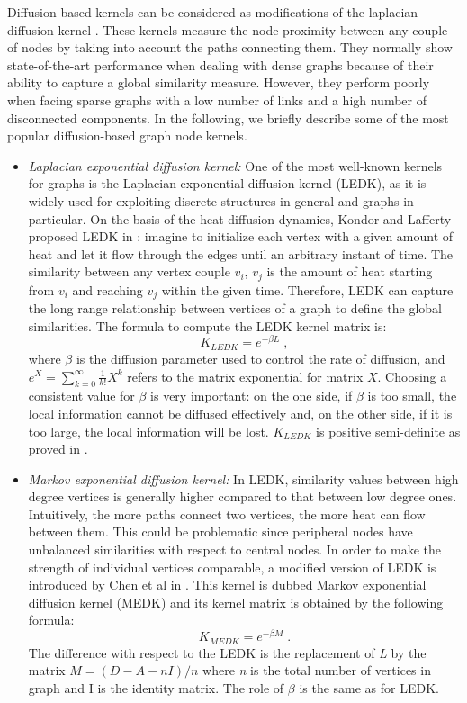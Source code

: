 \documentclass[runningheads,a4paper]{llncs}
\begin{document}
Diffusion-based kernels can be considered as modifications of the laplacian diffusion kernel \cite{proceeding2}. These kernels measure the node proximity between any couple of nodes by taking into account the paths connecting them. They normally show state-of-the-art performance when dealing with dense graphs because of their ability to capture a global similarity measure. However, they perform poorly  when facing  sparse graphs with a low number of links and a high number of disconnected components. In the following, we briefly describe some of the most popular diffusion-based graph node kernels.
\begin{itemize}
\item \textit{Laplacian exponential diffusion kernel:} One of the most well-known kernels for graphs is the Laplacian exponential diffusion kernel (LEDK), as it is widely used for exploiting discrete structures in general and graphs in particular. On the basis of the heat diffusion dynamics, Kondor and Lafferty proposed LEDK in \cite{proceeding2}: imagine to initialize each vertex with a given amount of heat and let it flow through the edges until an arbitrary instant of time. The similarity between any vertex couple $v_{i}$, $v_{j}$ is the amount of heat starting from $v_{i}$ and reaching $v_{j}$ within the given time. Therefore, LEDK can capture the long range relationship between vertices of a graph to define the global similarities. The formula to compute the LEDK kernel matrix is:
\begin{equation}
K_{LEDK} = e^{-\beta L}\; ,
\end{equation}
where $\beta$ is the diffusion parameter used to control the rate of diffusion, and $e^{X}=\sum_{k=0}^{\infty} \frac{1}{k!}X^k$ refers to the matrix exponential for matrix $X$. Choosing a consistent value for $\beta$ is very important: on the one side, if $\beta$ is too small, the local information cannot be diffused effectively and, on the other side, if it is too large, the local information will be lost. $K_{LEDK}$ is positive semi-definite as proved in \cite{proceeding2}.

\item \textit{Markov exponential diffusion kernel:} In LEDK, similarity values between high degree vertices is generally higher compared to that between low degree ones. Intuitively, the more paths connect two vertices, the more heat can flow between them. This could be problematic since peripheral nodes have unbalanced similarities with respect to central nodes. In order to make the strength of individual vertices comparable, a modified version of LEDK is introduced by Chen et al in \cite{proceeding3}.  This kernel is dubbed Markov exponential diffusion kernel (MEDK) and its kernel matrix is obtained by the following formula:
\begin{equation}
K_{MEDK} = e^{-\beta M}\; .
\end{equation}
The difference with respect to the LEDK is the replacement of \textit{L} by the matrix $M = (D-A-nI)/n$ where \textit{n} is the total number of vertices in graph and I is the identity matrix. The role of $\beta$ is the same as for LEDK.


\end{itemize}
\end{document}
